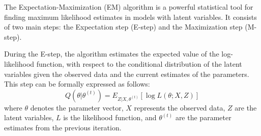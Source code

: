 \documentclass{article}
\begin{document}





The Expectation-Maximization (EM) algorithm is a powerful statistical tool for finding maximum likelihood estimates in models with latent variables. It consists of two main steps: the Expectation step (E-step) and the Maximization step (M-step).

During the E-step, the algorithm estimates the expected value of the log-likelihood function, with respect to the conditional distribution of the latent variables given the observed data and the current estimates of the parameters. This step can be formally expressed as follows:
\begin{equation}
Q(\theta | \theta^{(t)}) = E_{Z|X,\theta^{(t)}}[\log L(\theta; X, Z)]
\end{equation}
where \( \theta \) denotes the parameter vector, \( X \) represents the observed data, \( Z \) are the latent variables, \( L \) is the likelihood function, and \( \theta^{(t)} \) are the parameter estimates from the previous iteration.
\end{document}
